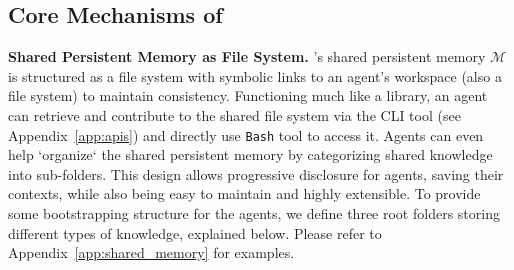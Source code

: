 






\subsection{Core Mechanisms of \method{}}


\textbf{Shared Persistent Memory as File System.}
\method{}'s shared persistent memory $\mathcal{M}$ is structured as a file system with symbolic links to an agent's workspace (also a file system) to maintain consistency. Functioning much like a library, an agent can retrieve and contribute to the shared file system via the \method{} CLI tool (see Appendix~\ref{app:apis}) and directly use \texttt{Bash} tool to access it. Agents can even help `organize` the shared persistent memory by categorizing shared knowledge into sub-folders. This design allows progressive disclosure for agents, saving their contexts, while also being easy to maintain and highly extensible. To provide some bootstrapping structure for the agents, we define three root folders storing different types of knowledge, explained below. Please refer to Appendix~\ref{app:shared_memory} for examples.

